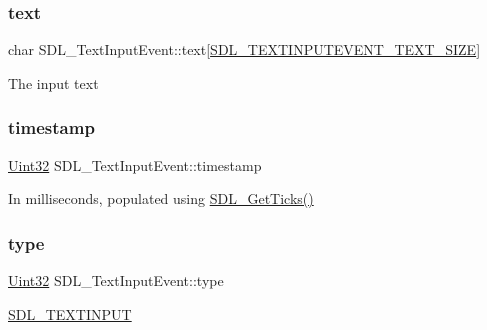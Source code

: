 \subsubsection{\texorpdfstring{text}{text}}
{\footnotesize\ttfamily char S\+D\+L\+\_\+\+Text\+Input\+Event\+::text\mbox{[}\hyperlink{_s_d_l__events_8h_a43822437fd5e89c1da1841a813cad4aa}{S\+D\+L\+\_\+\+T\+E\+X\+T\+I\+N\+P\+U\+T\+E\+V\+E\+N\+T\+\_\+\+T\+E\+X\+T\+\_\+\+S\+I\+ZE}\mbox{]}}

The input text \mbox{\label{struct_s_d_l___text_input_event_a20b190a96494918690ea7f99187be948}} 
\subsubsection{\texorpdfstring{timestamp}{timestamp}}
{\footnotesize\ttfamily \hyperlink{_s_d_l__stdinc_8h_add440eff171ea5f55cb00c4a9ab8672d}{Uint32} S\+D\+L\+\_\+\+Text\+Input\+Event\+::timestamp}

In milliseconds, populated using \hyperlink{_s_d_l__timer_8h_a0b9bc71d6287e0ffafdc3419760fe2b3}{S\+D\+L\+\_\+\+Get\+Ticks()} \mbox{\label{struct_s_d_l___text_input_event_a90576be2ea52e694deff40d0586654f5}} 
\subsubsection{\texorpdfstring{type}{type}}
{\footnotesize\ttfamily \hyperlink{_s_d_l__stdinc_8h_add440eff171ea5f55cb00c4a9ab8672d}{Uint32} S\+D\+L\+\_\+\+Text\+Input\+Event\+::type}

\hyperlink{_s_d_l__events_8h_a3b589e89be6b35c02e0dd34a55f3fccaa4fa2570088f6b9cbd109ae91b511368f}{S\+D\+L\+\_\+\+T\+E\+X\+T\+I\+N\+P\+UT} \mbox{\label{struct_s_d_l___text_input_event_aeb4f7a939353990ca40261ffbfbeb3d0}} 
